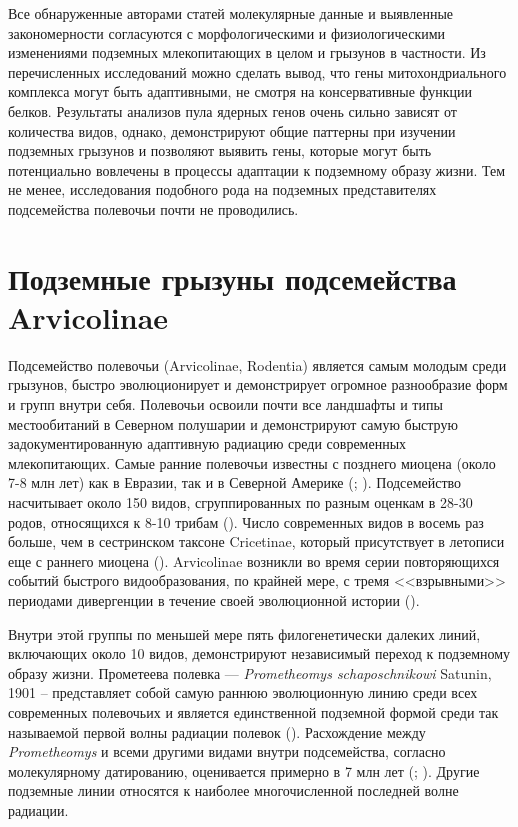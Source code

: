 Все обнаруженные авторами статей молекулярные данные и выявленные закономерности согласуются с морфологическими и физиологическими изменениями подземных млекопитающих в целом и грызунов в частности. Из перечисленных исследований можно сделать вывод, что гены митохондриального комплекса могут быть адаптивными, не смотря на консервативные функции белков. Результаты анализов пула ядерных генов очень сильно зависят от количества видов, однако, демонстрируют общие паттерны при изучении подземных грызунов и позволяют выявить гены, которые могут быть потенциально вовлечены в процессы адаптации к подземному образу жизни. Тем не менее, исследования подобного рода на подземных представителях подсемейства полевочьи почти не проводились. 



\section{Подземные грызуны подсемейства Arvicolinae}

Подсемейство полевочьи (Arvicolinae, Rodentia) является самым молодым среди грызунов, быстро эволюционирует и демонстрирует огромное разнообразие форм и групп внутри себя. Полевочьи освоили почти все ландшафты и типы местообитаний в Северном полушарии и демонстрируют самую быструю задокументированную адаптивную радиацию среди современных млекопитающих. Самые ранние полевочьи известны с позднего миоцена (около 7-8 млн лет) как в Евразии, так и в Северной Америке (\cite{RobertA.Martin2003}; \cite{Fejfar2011}). Подсемейство насчитывает около 150 видов, сгруппированных по разным оценкам в 28-30 родов, относящихся к 8-10 трибам (\cite{Balakirev2012}). Число современных видов в восемь раз больше, чем в сестринском таксоне Cricetinae, который присутствует в летописи еще с раннего миоцена (\cite{GomesRodrigues2012}). Arvicolinae возникли во время серии повторяющихся событий быстрого видообразования, по крайней мере, с тремя <<взрывными>> периодами дивергенции в течение своей эволюционной истории (\cite{Abramson2009}).

Внутри этой группы по меньшей мере пять филогенетически далеких линий, включающих около 10 видов, демонстрируют независимый переход к подземному образу жизни. Прометеева полевка --- \textit{Prometheomys schaposchnikowi} Satunin, 1901 -- представляет собой самую раннюю эволюционную линию среди всех современных полевочьих и является единственной подземной формой среди так называемой первой волны радиации полевок (\cite{Abramson2009}). 
Расхождение между \textit{Prometheomys} и всеми другими видами внутри подсемейства, согласно молекулярному датированию, оценивается примерно в 7 млн лет (\cite{Widmer1997}; \cite{KLEINSCHMIDT1984}). Другие подземные линии  относятся к наиболее многочисленной последней волне радиации. 

